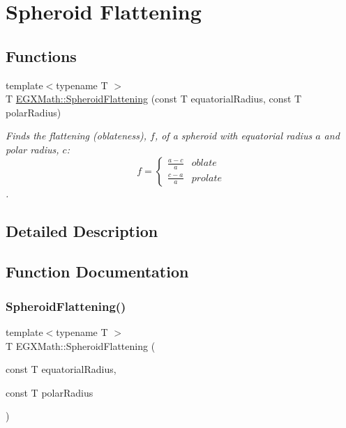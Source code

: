 \hypertarget{group___e_g_x_math-_geometry-3_d-_spheroid_flattening}{}\section{Spheroid Flattening}
\label{group___e_g_x_math-_geometry-3_d-_spheroid_flattening}
\subsection*{Functions}
\begin{DoxyCompactItemize}
\item 
{\footnotesize template$<$typename T $>$ }\\T \mbox{\hyperlink{group___e_g_x_math-_geometry-3_d-_spheroid_flattening_ga640f4bcd86aa4c378819bffda31c0852}{E\+G\+X\+Math\+::\+Spheroid\+Flattening}} (const T equatorial\+Radius, const T polar\+Radius)
\begin{DoxyCompactList}\small\item\em Finds the flattening (oblateness), $f$, of a spheroid with equatorial radius $a$ and polar radius, $c$\+: \[ f =\begin{cases} \frac{a-c}{a}{} & oblate \\ \frac{c-a}{a} & prolate \end{cases} \]. \end{DoxyCompactList}\end{DoxyCompactItemize}


\subsection{Detailed Description}


\subsection{Function Documentation}
\mbox{\label{group___e_g_x_math-_geometry-3_d-_spheroid_flattening_ga640f4bcd86aa4c378819bffda31c0852}} 
\subsubsection{\texorpdfstring{Spheroid\+Flattening()}{SpheroidFlattening()}}
{\footnotesize\ttfamily template$<$typename T $>$ \\
T E\+G\+X\+Math\+::\+Spheroid\+Flattening (\begin{DoxyParamCaption}\item[{const T}]{equatorial\+Radius,  }\item[{const T}]{polar\+Radius }\end{DoxyParamCaption})}



